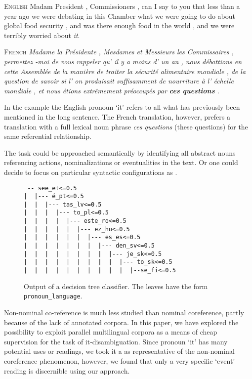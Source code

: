 \documentclass[10pt, a4paper]{article} \usepackage{lrec} \usepackage{multibib}
\begin{document}
\textsc{English} Madam President , Commissioners , can I say to you that less than a year ago we were debating in this Chamber what we were going to do about global food security , and was there enough food in the world , and we were terribly worried about \textit{it}.

\textsc{French} \textit{Madame la Présidente , Mesdames et Messieurs les Commissaires , permettez -moi de vous rappeler qu' il y a moins d' un an , nous débattions en cette Assemblée de la manière de traiter la sécurité alimentaire mondiale , de la question de savoir si l' on produisait suffisamment de nourriture à l' échelle mondiale , et nous étions extrêmement préoccupés par \textbf{ces questions} .}

\vspace{1em}

In the example the English pronoun `it' refers to all what has previously been mentioned in the long sentence. The French translation, however, prefers a translation with a full lexical noun phrase \textit{ces questions} (these questions) for the same referential relationship. 

The task could be approached semantically by identifying all abstract
nouns referencing actions, nominalizations or eventualities in the text. Or one
could decide to focus on particular syntactic configurations as
.

\begin{figure}
\begin{verbatim}
 -- see_et<=0.5
|  |--- é_pt<=0.5
|  |  |--- tas_lv<=0.5
|  |  |  |--- to_pl<=0.5
|  |  |  |  |--- este_ro<=0.5
|  |  |  |  |  |--- ez_hu<=0.5
|  |  |  |  |  |  |--- es_es<=0.5
|  |  |  |  |  |  |  |--- den_sv<=0.5
|  |  |  |  |  |  |  |  |--- je_sk<=0.5
|  |  |  |  |  |  |  |  |  |--- to_sk<=0.5
|  |  |  |  |  |  |  |  |  |  |--se_fi<=0.5
\end{verbatim}
\caption{Output of a decision tree classifier. The leaves have the form \texttt{pronoun\_language}.}\label{fig:decisiontree}
\end{figure}

Non-nominal co-reference is much less studied than nominal coreference, partly
because of the lack of annotated corpora. In this paper, we have explored the
possibility to exploit parallel multilingual corpora as a means of cheap
supervision for the task of it-disambiguation. Since pronoun `it' has many
potential uses or readings, we took it a as representative of the non-nominal
coreference phenomenon, however, we found that only a very specific `event' reading 
is discernible using our approach. 
\end{document}
